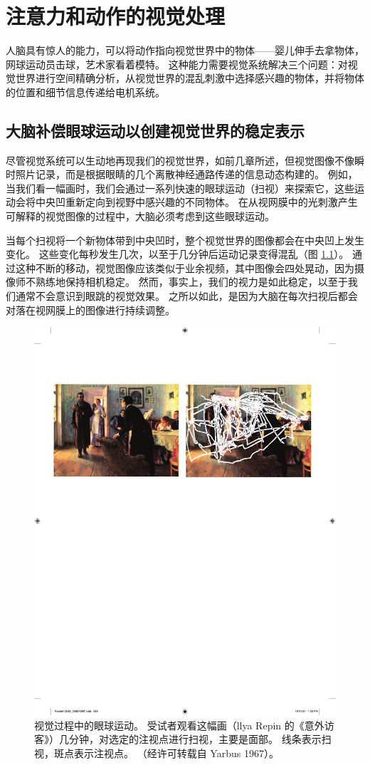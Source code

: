 \chapter{注意力和动作的视觉处理} \label{chap:chap25}
人脑具有惊人的能力，可以将动作指向视觉世界中的物体——婴儿伸手去拿物体，网球运动员击球，艺术家看着模特。 
这种能力需要视觉系统解决三个问题：对视觉世界进行空间精确分析，从视觉世界的混乱刺激中选择感兴趣的物体，并将物体的位置和细节信息传递给电机系统。

\section{大脑补偿眼球运动以创建视觉世界的稳定表示}
尽管视觉系统可以生动地再现我们的视觉世界，如前几章所述，但视觉图像不像瞬时照片记录，而是根据眼睛的几个离散神经通路传递的信息动态构建的。 例如，当我们看一幅画时，我们会通过一系列快速的眼球运动（扫视）来探索它，这些运动会将中央凹重新定向到视野中感兴趣的不同物体。 在从视网膜中的光刺激产生可解释的视觉图像的过程中，大脑必须考虑到这些眼球运动。

当每个扫视将一个新物体带到中央凹时，整个视觉世界的图像都会在中央凹上发生变化。 这些变化每秒发生几次，以至于几分钟后运动记录变得混乱（图 \ref{fig:25_1}）。 
通过这种不断的移动，视觉图像应该类似于业余视频，其中图像会四处晃动，因为摄像师不熟练地保持相机稳定。 然而，事实上，我们的视力是如此稳定，以至于我们通常不会意识到眼跳的视觉效果。 之所以如此，是因为大脑在每次扫视后都会对落在视网膜上的图像进行持续调整。

\begin{figure}[htbp]
	\centering
	\includegraphics[width=0.65\linewidth]{chap25/fig_25_1}
	\caption{视觉过程中的眼球运动。 受试者观看这幅画（llya Repin 的《意外访客》）几分钟，对选定的注视点进行扫视，主要是面部。 线条表示扫视，斑点表示注视点。 （经许可转载自 Yarbus 1967）。}
	\label{fig:25_1}
\end{figure}

